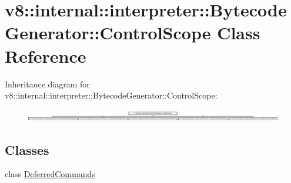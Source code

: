 \hypertarget{classv8_1_1internal_1_1interpreter_1_1BytecodeGenerator_1_1ControlScope}{}\section{v8\+:\+:internal\+:\+:interpreter\+:\+:Bytecode\+Generator\+:\+:Control\+Scope Class Reference}
\label{classv8_1_1internal_1_1interpreter_1_1BytecodeGenerator_1_1ControlScope}
Inheritance diagram for v8\+:\+:internal\+:\+:interpreter\+:\+:Bytecode\+Generator\+:\+:Control\+Scope\+:\begin{figure}[H]
\begin{center}
\leavevmode
\includegraphics[height=0.529551cm]{classv8_1_1internal_1_1interpreter_1_1BytecodeGenerator_1_1ControlScope}
\end{center}
\end{figure}
\subsection*{Classes}
\begin{DoxyCompactItemize}
\item 
class \mbox{\hyperlink{classv8_1_1internal_1_1interpreter_1_1BytecodeGenerator_1_1ControlScope_1_1DeferredCommands}{Deferred\+Commands}}
\end{DoxyCompactItemize}

